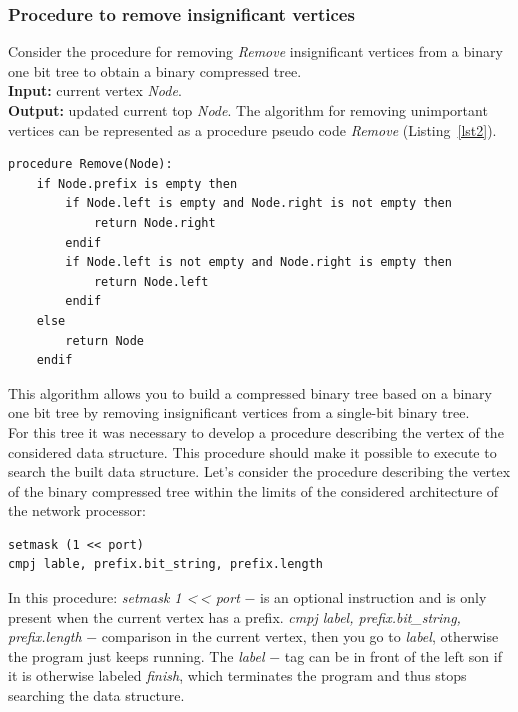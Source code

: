 \documentclass[conference]{IEEEtran}
\begin{document}
            \subsubsection{Procedure to remove insignificant vertices}
                Consider the procedure for removing \emph{Remove} insignificant vertices 
                from a binary one bit tree to obtain a binary compressed tree. 
                \\
                {\bf Input:} current vertex \emph{Node}.
                \\
                {\bf Output:} updated current top \emph{Node}.
                The algorithm for removing unimportant vertices can be represented 
                as a procedure pseudo code \emph{Remove} (Listing~\ref{lst2}).
\\
\begin{center} 
\begin{lstlisting}[caption=The procedure for removing insignificant vertexes., label=lst2]
procedure Remove(Node):
    if Node.prefix is empty then
        if Node.left is empty and Node.right is not empty then
            return Node.right
        endif
        if Node.left is not empty and Node.right is empty then
            return Node.left
        endif
    else
        return Node
    endif
\end{lstlisting}
\end{center}
\vspace{1em}
            This algorithm allows you to build a compressed binary tree based on a binary one bit tree 
            by removing insignificant vertices from a single-bit binary tree. \\
            For this tree it was necessary to develop a procedure describing the vertex 
            of the considered data structure. This procedure should make it possible to execute
            to search the built data structure.
            Let's consider the procedure describing the vertex of the binary compressed tree 
            within the limits of the considered architecture of the network processor:
\\
\begin{lstlisting}[caption=Procedure for describing the tip of a compressed binary tree.]
setmask (1 << port)
cmpj lable, prefix.bit_string, prefix.length
\end{lstlisting}
\vspace{1em}
            In this procedure:
            \emph{setmask 1 <\,< port} $-$ is an optional instruction 
            and is only present when the current vertex has a prefix.
            \emph{cmpj label, prefix.bit\_string, prefix.length} $-$ comparison in the current vertex, 
            then you go to \emph{label}, otherwise the program just keeps running.
            The \emph{label} $-$ tag can be in front of the left son if it is otherwise labeled \emph{finish},
            which terminates the program and thus stops searching the data structure.
\end{document}
